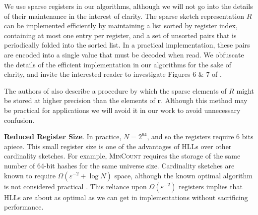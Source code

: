 \documentclass{report}
\newcommand{\algoname}[1]{\textnormal{\textsc{#1}}}
\begin{document}
We use sparse registers in our algorithms, although we will not go into the details of their maintenance in the interest of clarity.
The sparse sketch representation $R$ can be implemented efficiently by maintaining a list sorted by register index, containing at most one entry per register, and a set of unsorted pairs that is periodically folded into the sorted list.
In a practical implementation, these pairs are encoded into a single value that must be decoded when read.
We obfuscate the details of the efficient implementation in our algorithms for the sake of clarity, and invite the interested reader to investigate Figures 6 \& 7 of \cite{heule2013hyperloglog}.

The authors of \cite{heule2013hyperloglog} also describe a procedure by which the sparse elements of $R$ might be stored at higher precision than the elements of $\mathbf{r}$.
Although this method may be practical for applications we will avoid it in our work to avoid unnecessary confusion.







\vspace{1em}
\textbf{Reduced Register Size}.
In practice, $N= 2^{64}$, and so the registers require 6 bits apiece.
This small register size is one of the advantages of \algoname{HLL}s over other cardinality sketches.
For example, \algoname{MinCount} requires the storage of the same number of 64-bit hashes for the same universe size. 
Cardinality sketches are known to require $\Omega(\varepsilon^{-2} + \log N)$ space, although the known optimal algorithm is not considered practical \cite{kane2010optimal}.
This reliance upon $\Omega(\varepsilon^{-2})$ registers implies that \algoname{HLL}s are about as optimal as we can get in implementations without sacrificing performance.
\end{document}
